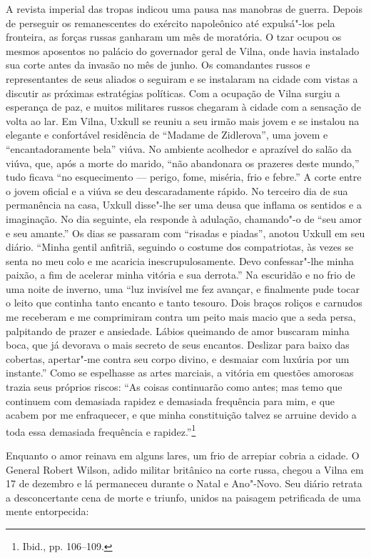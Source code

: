 A revista imperial das tropas indicou uma pausa nas manobras de guerra.
Depois de perseguir os remanescentes do exército napoleônico até
expulsá"-los pela fronteira, as forças russas ganharam um mês de
moratória. O tzar ocupou os mesmos aposentos no palácio do governador
geral de Vilna, onde havia instalado sua corte antes da invasão no mês
de junho. Os comandantes russos e representantes de seus aliados o
seguiram e se instalaram na cidade com vistas a discutir as próximas
estratégias políticas. Com a ocupação de Vilna surgiu a esperança de
paz, e muitos militares russos chegaram à cidade com a sensação de volta
ao lar. Em Vilna, Uxkull se reuniu a seu irmão mais jovem e se instalou
na elegante e confortável residência de ``Madame de Zidlerova'', uma
jovem e ``encantadoramente bela'' viúva. No ambiente acolhedor e
aprazível do salão da viúva, que, após a morte do marido, ``não
abandonara os prazeres deste mundo,'' tudo ficava ``no esquecimento ---
perigo, fome, miséria, frio e febre.'' A corte entre o jovem oficial e a
viúva se deu descaradamente rápido. No terceiro dia de sua permanência
na casa, Uxkull disse"-lhe ser uma deusa que inflama os sentidos e a
imaginação. No dia seguinte, ela responde à adulação, chamando"-o de
``seu amor e seu amante.'' Os dias se passaram com ``risadas e piadas'',
anotou Uxkull em seu diário. ``Minha gentil anfitriã, seguindo o costume
dos compatriotas, às vezes se senta no meu colo e me acaricia
inescrupulosamente. Devo confessar"-lhe minha paixão, a fim de acelerar
minha vitória e sua derrota.'' Na escuridão e no frio de uma noite de
inverno, uma ``luz invisível me fez avançar, e finalmente pude tocar o
leito que continha tanto encanto e tanto tesouro. Dois braços roliços e
carnudos me receberam e me comprimiram contra um peito mais macio que a
seda persa, palpitando de prazer e ansiedade. Lábios queimando de amor
buscaram minha boca, que já devorava o mais secreto de seus encantos.
Deslizar para baixo das cobertas, apertar"-me contra seu corpo divino, e
desmaiar com luxúria por um instante.'' Como se espelhasse as artes
marciais, a vitória em questões amorosas trazia seus próprios riscos:
``As coisas continuarão como antes; mas temo que continuem com demasiada
rapidez e demasiada frequência para mim, e que acabem por me
enfraquecer, e que minha constituição talvez se arruine devido a toda
essa demasiada frequência e rapidez.''\footnote{Ibid., pp. 106--109.}

Enquanto o amor reinava em alguns lares, um frio de arrepiar cobria a
cidade. O General Robert Wilson, adido militar britânico na corte russa,
chegou a Vilna em 17 de dezembro e lá permaneceu durante o Natal e
Ano"-Novo. Seu diário retrata a desconcertante cena de morte e triunfo,
unidos na paisagem petrificada de uma mente entorpecida:

